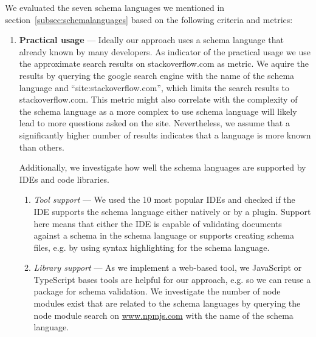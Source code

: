 We evaluated the seven schema languages we mentioned in section~\ref{subsec:schemalanguages} based on the following criteria and metrics:
\begin{enumerate}
    \item \textbf{Practical usage} --- Ideally our approach uses a schema language that already known by many developers.
    As indicator of the practical usage we use the approximate search results on stackoverflow.com as metric.
    We aquire the results by querying the google search engine with the name of the schema language and ``site:stackoverflow.com'', which limits the search results to stackoverflow.com.
    This metric might also correlate with the complexity of the schema language as a more complex to use schema language will likely lead to more questions asked on the site. Nevertheless, we assume that a significantly higher number of results indicates that a language is more known than others.

    Additionally, we investigate how well the schema languages are supported by IDEs and code libraries.
    \begin{enumerate}
        \item \textit{Tool support} --- We used the 10 most popular IDEs\cite{mostpopularides} and checked if the IDE supports the schema language either natively or by a plugin. Support here means that either the IDE is capable of validating documents against a schema in the schema language or supports creating schema files, e.g. by using syntax highlighting for the schema language.
        \item \textit{Library support} --- As we implement a web-based tool, we JavaScript or TypeScript bases tools are helpful for our approach, e.g. so we can reuse a package for schema validation. We investigate the number of node modules exist that are related to the schema languages by querying the node module search on \url{www.npmjs.com} with the name of the schema language.

    \end{enumerate}


\end{enumerate}
